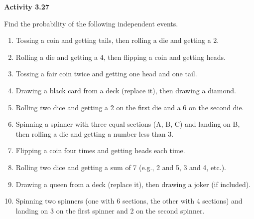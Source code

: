 \vspace{0.3ex}
\noindent\textbf{Activity 3.27}

\vspace{0.2ex}

Find the probability of the following independent events.

\begin{enumerate}[label=\color{blue}\arabic*.]
    \item Tossing a coin and getting tails, then rolling a die and getting a 2.
    \item Rolling a die and getting a 4, then flipping a coin and getting heads.
    \item Tossing a fair coin twice and getting one head and one tail.
    \item Drawing a black card from a deck (replace it), then drawing a diamond.
    \item Rolling two dice and getting a 2 on the first die and a 6 on the second die.
    \item Spinning a spinner with three equal sections (A, B, C) and landing on B, then rolling a die and getting a number less than 3.
    \item Flipping a coin four times and getting heads each time.
    \item Rolling two dice and getting a sum of 7 (e.g., 2 and 5, 3 and 4, etc.).
    \item Drawing a queen from a deck (replace it), then drawing a joker (if included).
    \item Spinning two spinners (one with 6 sections, the other with 4 sections) and landing on 3 on the first spinner and 2 on the second spinner.
\end{enumerate}
